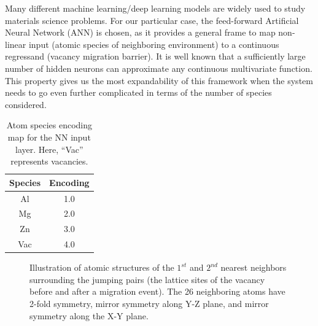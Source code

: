Many different machine learning/deep learning models are widely used to study materials science problems\cite{bartok2010gaussian,behler2011atom,szlachta2014accuracy,artrith2016implementation,mehta2014exact,artrith2017efficient}. For our particular case, the feed-forward Artificial Neural Network (ANN) is chosen, as it provides a general frame to map non-linear input (atomic species of neighboring environment) to a continuous regressand (vacancy migration barrier). It is well known that a sufficiently large number of hidden neurons can approximate any continuous multivariate function\cite{hornik1989multilayer}. This property gives us the most expandability of this framework when the system needs to go even further complicated in terms of the number of species considered. 

\begin{table}[!htbp]
\centering
\caption[Atom species encoding map for the \acf{NN} input layer.]{Atom species encoding map for the \acf{NN} input layer. Here, ``Vac'' represents vacancies.}
\label{Chap:Al/Vac:tab:mapping}
\begin{tabular}{cc}
\\
\hline
\hline
Species & Encoding  \\ \hline
Al & 1.0 \\
Mg & 2.0 \\
Zn & 3.0 \\
Vac & 4.0 \\
\hline
\hline
\end{tabular}
\end{table}

\begingroup
\begin{figure}[!ht]
  \centering
\caption[Illustration of atomic structures of the $\text{1}^{st}$ and $\text{2}^{nd}$ nearest neighbors surrounding the jumping pairs (the lattice sites of the vacancy before and after a migration event).]{Illustration of atomic structures of the $\text{1}^{st}$ and $\text{2}^{nd}$ nearest neighbors surrounding the jumping pairs (the lattice sites of the vacancy before and after a migration event). The 26 neighboring atoms have 2-fold symmetry, mirror symmetry along Y-Z plane, and mirror symmetry along the X-Y plane.}
\label{Chap:Al/Vac:fig:2nn}
\end{figure}
\endgroup

